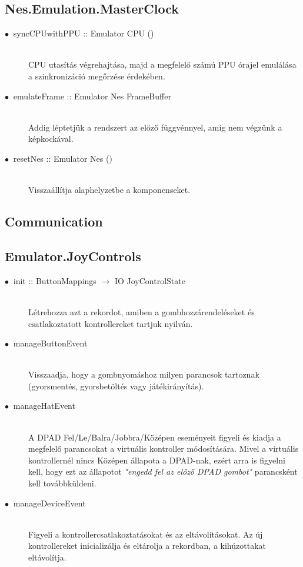 \subsection{Nes.Emulation.MasterClock}

\begin{description}
	\item[$\bullet\:$ syncCPUwithPPU :: Emulator CPU ()] \hfill \\
	CPU utasítás végrehajtása, majd a megfelelő számú PPU órajel emulálása a szinkronizáció megőrzése érdekében.
	\item[$\bullet\:$ emulateFrame :: Emulator Nes FrameBuffer] \hfill \\
	Addig léptetjük a rendszert az előző függvénnyel, amíg nem végzünk a képkockával.
	\item[$\bullet\:$ resetNes :: Emulator Nes ()] \hfill \\
	Visszaállítja alaphelyzetbe a komponenseket. 
\end{description}

\subsection{Communication}

\subsection{Emulator.JoyControls}

\begin{description}
	\item[$\bullet\:$ init :: ButtonMappings $\rightarrow$ IO JoyControlState] \hfill \\
	Létrehozza azt a rekordot, amiben a gombhozzárendeléseket és csatlakoztatott kontrollereket tartjuk nyilván.
	\item[$\bullet\:$ manageButtonEvent] \hfill \\
	Visszaadja, hogy a gombnyomáshoz milyen parancsok tartoznak (gyorsmentés, gyorsbetöltés vagy játékirányítás). 
	\item[$\bullet\:$ manageHatEvent] \hfill \\
	A DPAD Fel/Le/Balra/Jobbra/Középen eseményeit figyeli és kiadja a megfelelő parancsokat a virtuális kontroller módosítására. Mivel a virtuális kontrollernél nincs Középen állapota a DPAD-nak, ezért arra is figyelni kell, hogy ezt az állapotot \emph{"engedd fel az előző DPAD gombot"} parancsként kell továbbküldeni.
	\item[$\bullet\:$ manageDeviceEvent] \hfill \\
	Figyeli a kontrollercsatlakoztatásokat és az eltávolításokat.
	Az új kontrollereket inicializálja és eltárolja a rekordban, a kihúzottakat eltávolítja.
\end{description}

